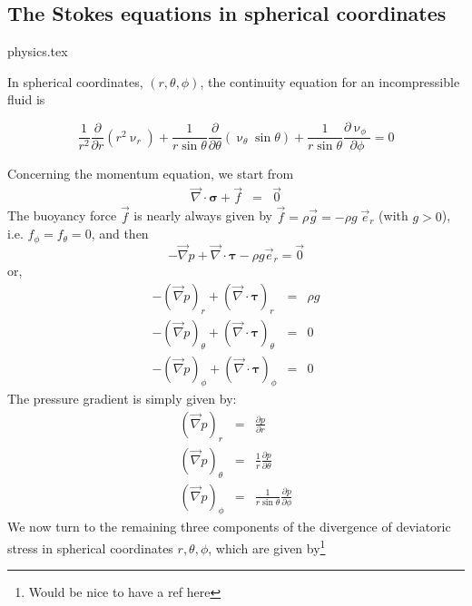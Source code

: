 \subsection{The Stokes equations in spherical coordinates}
\begin{flushright} {\tiny {\color{gray} physics.tex}} \end{flushright}



In spherical coordinates, $(r,\theta,\phi)$, the continuity equation for an incompressible fluid is 
\begin{mdframed}[backgroundcolor=blue!5]
\begin{equation}
\frac{1}{r^2} \frac{\partial}{\partial r} (r^2 \upnu_r) + 
\frac{1}{r \sin \theta} \frac{\partial}{\partial \theta} (\upnu_\theta \sin \theta)+
\frac{1}{r \sin \theta} \frac{\partial \upnu_\phi}{\partial \phi} = 0
\end{equation}
\end{mdframed}


Concerning the momentum equation, we start from 
\begin{eqnarray}
{\vec \nabla}\cdot {\bm \sigma} + {\vec f} &=& \vec{0} 
\end{eqnarray}
The buoyancy force $\vec{f}$ is nearly always given by 
$\vec{f}=\rho \vec{g} = - \rho g \; \vec{e}_r$ (with $g>0$), i.e. $f_\phi=f_\theta=0$, and then
\[
- {\vec \nabla}p + {\vec \nabla}\cdot {\bm \tau} - \rho g \vec{e}_r = \vec{0}
\]
or,
\begin{eqnarray}
- ({\vec \nabla}p)_r      + ({\vec \nabla}\cdot {\bm \tau})_r     &=& \rho {g} \nonumber\\
- ({\vec \nabla}p)_\theta + ({\vec \nabla}\cdot {\bm \tau})_\theta&=&0  \nonumber\\
- ({\vec \nabla}p)_\phi   + ({\vec \nabla}\cdot {\bm \tau})_\phi  &=&0  \nonumber
\end{eqnarray}
The pressure gradient is simply given by:
\begin{eqnarray}
({\vec \nabla}p)_r &=& \frac{\partial p}{\partial r}  \nonumber\\
({\vec \nabla}p)_\theta &=& \frac{1}{r}\frac{\partial p}{\partial \theta}  \nonumber\\
({\vec \nabla}p)_\phi &=& \frac{1}{r\sin\theta}\frac{\partial p}{\partial \phi}  \nonumber
\end{eqnarray}
We now turn to the remaining three components of the divergence of deviatoric stress in 
spherical coordinates $r,\theta,\phi$, which are given by\footnote{Would be nice to 
have a ref here} %

